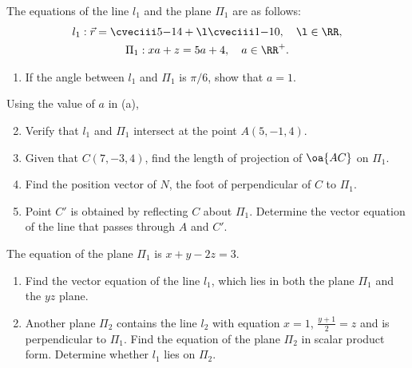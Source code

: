 \begin{problem}
    The equations of the line $l_1$ and the plane $\Pi_1$ are as follows:
    \begin{gather*}
        l_1 : \vec r = \cveciii5{-1}4 + \l \cveciii1{-1}0, \quad \l \in \RR, \\
        \Pi_1 : xa + z = 5a + 4, \quad a \in \RR^+.
    \end{gather*}

    \begin{enumerate}
        \item If the angle between $l_1$ and $\Pi_1$ is $\pi/6$, show that $a = 1$.
    \end{enumerate}

    Using the value of $a$ in (a),

    \begin{enumerate}
        \setcounter{enumi}{1}
        \item Verify that $l_1$ and $\Pi_1$ intersect at the point $A(5, -1, 4)$.
        \item Given that $C(7, -3, 4)$, find the length of projection of $\oa{AC}$ on $\Pi_1$.
        \item Find the position vector of $N$, the foot of perpendicular of $C$ to $\Pi_1$.
        \item Point $C'$ is obtained by reflecting $C$ about $\Pi_1$. Determine the vector equation of the line that passes through $A$ and $C'$.
    \end{enumerate}
\end{problem}

\begin{problem}
    The equation of the plane $\Pi_1$ is $x + y - 2z = 3$.

    \begin{enumerate}
        \item Find the vector equation of the line $l_1$, which lies in both the plane $\Pi_1$ and the $yz$ plane.
        \item Another plane $\Pi_2$ contains the line $l_2$ with equation $x = 1$, $\frac{y+1}{2} = z$ and is perpendicular to $\Pi_1$. Find the equation of the plane $\Pi_2$ in scalar product form. Determine whether $l_1$ lies on $\Pi_2$.
    \end{enumerate}
\end{problem}

